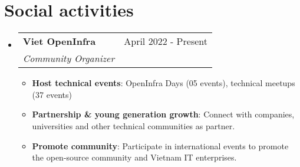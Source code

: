 \documentclass[letterpaper,11pt]{article}
\makeatletter
\newcommand{\resumeItem}[2]{
  \item\small{
    \textbf{#1}{: #2 \vspace{-2pt}}
  }
}
\newcommand{\resumeItemNornal}[1]{
  \item\small{
    {#1 \vspace{-2pt}}
  }
}
\newcommand{\resumeSubheading}[4]{
  \vspace{-1pt}
  \item
    \begin{tabular*}{0.97\textwidth}{l@{\extracolsep{\fill}}r}
      \textbf{#1} & #2 \\
      \textit{\small#3} & \textit{\small #4} \\
    \end{tabular*}\vspace{-5pt}
}
\newcommand{\resumeSubItemNormal}[1]{\resumeItemNornal{#1}\vspace{-4pt}}
\newcommand{\resumeSubHeadingListStart}{\begin{itemize}[leftmargin=*]}
\newcommand{\resumeSubHeadingListEnd}{\end{itemize}}
\newcommand{\resumeItemListStart}{\begin{itemize}}
\newcommand{\resumeItemListEnd}{\end{itemize}\vspace{-5pt}}
\makeatother
\begin{document}


\section{Social activities}
\resumeSubHeadingListStart

    \resumeSubheading
      {Viet OpenInfra}{April 2022 - Present}
      {Community Organizer}{}
      \resumeItemListStart
        \resumeItem{Host technical events}
        {OpenInfra Days (05 events), technical meetups (37 events)}
        \resumeItem{Partnership \& young generation growth}
        {Connect with companies, universities and other technical communities as partner.} 
        \resumeItem{Promote community}
        {Participate in international events to promote the open-source community and Vietnam IT enterprises.} 
      \resumeItemListEnd

  \resumeSubHeadingListEnd



\end{document}
